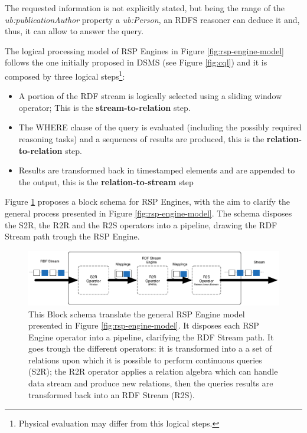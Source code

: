 The requested information is not explicitly stated, but being the range of the \textit{ub:publicationAuthor} property a \textit{ub:Person}, an RDFS reasoner can deduce it and, thus, it can allow to answer the query.

The logical processing model of RSP Engines in Figure \ref{fig:rsp-engine-model} follows the one initially proposed in DSMS (see Figure \ref{fig:cql}) and it is composed by three logical steps\footnote{Physical evaluation may differ from this logical steps.}: 
\begin{itemize}
\item[1.] A portion of the RDF stream is logically selected using a sliding window operator; This is the \textbf{stream-to-relation} step. 
\item[2.] The WHERE clause of the query is evaluated (including the possibly required reasoning tasks) and a sequences of results are produced, this is the \textbf{relation-to-relation} step.
\item[3.] Results are transformed back in timestamped elements and are appended to the output, this is the \textbf{relation-to-stream} step 
\end{itemize}

Figure \ref{fig:rsp-engine-schema} proposes a block schema for RSP Engines, with the aim to clarify the general process presented in Figure \ref{fig:rsp-engine-model}. The schema disposes the S2R, the R2R and the R2S operators into a pipeline, drawing the RDF Stream path trough the RSP Engine.


\begin{figure}[tbh]
  \centering
	\includegraphics[width=\linewidth]{images/rsp-block-schema}
	\caption[RSP Engine Block Schema]{This Block schema translate the general RSP Engine model presented in Figure \ref{fig:rsp-engine-model}. It disposes each RSP Engine operator into a pipeline, clarifying the RDF Stream path. It goes trough the different operators: it is transformed into a a set of relations upon which it is possible to perform continuous queries (S2R); the R2R operator applies a relation algebra which can handle data stream and produce new relations, then the queries results are transformed back into an RDF Stream (R2S).}
  	\label{fig:rsp-engine-schema}
\end{figure}

